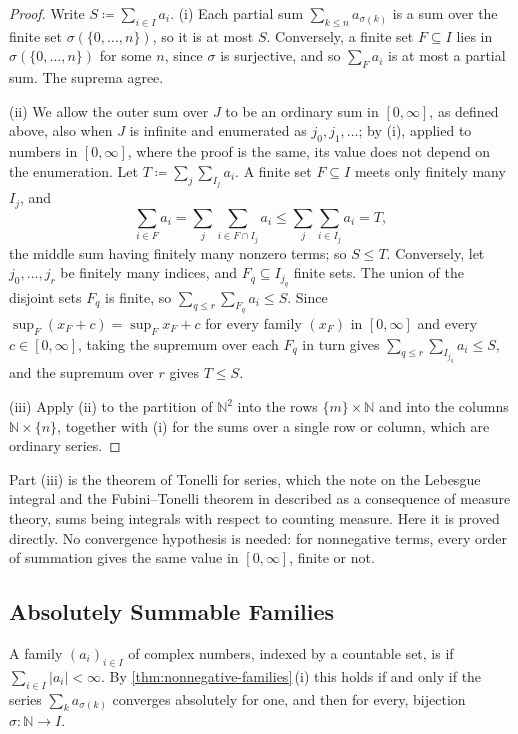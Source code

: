 \begin{proof}
Write $S\coloneqq\sum_{i\in I}a_i$. (i) Each partial sum $\sum_{k\le n}a_{\sigma(k)}$ is a sum over the finite set $\sigma(\{0,\ldots,n\})$, so it is at most $S$. Conversely, a finite set $F\subseteq I$ lies in $\sigma(\{0,\ldots,n\})$ for some $n$, since $\sigma$ is surjective, and so $\sum_Fa_i$ is at most a partial sum. The suprema agree.

(ii) We allow the outer sum over $J$ to be an ordinary sum in $[0,\infty]$, as defined above, also when $J$ is infinite and enumerated as $j_0,j_1,\ldots$; by (i), applied to numbers in $[0,\infty]$, where the proof is the same, its value does not depend on the enumeration. Let $T\coloneqq\sum_j\sum_{I_j}a_i$. A finite set $F\subseteq I$ meets only finitely many $I_j$, and
\[
\sum_{i\in F}a_i=\sum_j\sum_{i\in F\cap I_j}a_i\le\sum_j\sum_{i\in I_j}a_i=T ,
\]
the middle sum having finitely many nonzero terms; so $S\le T$. Conversely, let $j_0,\ldots,j_r$ be finitely many indices, and $F_q\subseteq I_{j_q}$ finite sets. The union of the disjoint sets $F_q$ is finite, so $\sum_{q\le r}\sum_{F_q}a_i\le S$. Since $\sup_F(x_F+c)=\sup_Fx_F+c$ for every family $(x_F)$ in $[0,\infty]$ and every $c\in[0,\infty]$, taking the supremum over each $F_q$ in turn gives $\sum_{q\le r}\sum_{I_{j_q}}a_i\le S$, and the supremum over $r$ gives $T\le S$.

(iii) Apply (ii) to the partition of $\mathbb N^2$ into the rows $\{m\}\times\mathbb N$ and into the columns $\mathbb N\times\{n\}$, together with (i) for the sums over a single row or column, which are ordinary series.
\end{proof}

Part (iii) is the theorem of Tonelli for series, which the note on the Lebesgue integral and the Fubini--Tonelli theorem in  described as a consequence of measure theory, sums being integrals with respect to counting measure. Here it is proved directly. No convergence hypothesis is needed: for nonnegative terms, every order of summation gives the same value in $[0,\infty]$, finite or not.

\subsection{Absolutely Summable Families}

A family $(a_i)_{i\in I}$ of complex numbers, indexed by a countable set, is  if $\sum_{i\in I}|a_i|<\infty$. By \cref{thm:nonnegative-families}\,(i) this holds if and only if the series $\sum_ka_{\sigma(k)}$ converges absolutely for one, and then for every, bijection $\sigma\colon\mathbb N\to I$.

